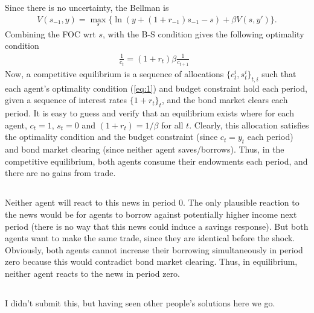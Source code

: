 \documentclass[12pt]{article}
\begin{document}
Since there is no uncertainty, the Bellman is 
\begin{align*}
V(s_{-1} , y) = \max_s \{ \ln(y+(1+r_{-1})s_{-1} - s) + \beta V(s,y')\}.
\end{align*}
Combining the FOC wrt $s$, with the B-S condition gives the following optimality condition
\begin{align}
\frac{1}{c_t} = (1+r_t)\beta \frac{1}{c_{t+1}} \text{ } \label{eq:1}
\end{align}
Now, a competitive equilibrium is a sequence of allocations $\{c^i_t, s^i_t\}_{t,i}$ such that each agent's optimality condition (\ref{eq:1}) and budget constraint hold each period, given a sequence of interest rates $\{1+r_t\}_t$, and the bond market clears each period. It is easy to guess and verify that an equilibrium exists where for each agent, $c_t = 1$, $s_t = 0$ and $(1+r_t) = 1/\beta$ for all $t$. Clearly, this allocation satisfies the optimality condition and the budget constraint (since $c_t = y_t$ each period) and bond market clearing (since neither agent saves/borrows). Thus, in the competitive equilibrium, both agents consume their endowments each period, and there are no gains from trade.

\subsection{}
Neither agent will react to this news in period 0. The only plausible reaction to the news would be for agents to borrow against potentially higher income next period (there is no way that this news could induce a savings response). But both agents want to make the same trade, since they are identical before the shock. Obviously, both agents cannot increase their borrowing simultaneously in period zero because this would contradict bond market clearing. Thus, in equilibrium, neither agent reacts to the news in period zero.

\subsection{}
I didn't submit this, but having seen other people's solutions here we go.\\
\end{document}
